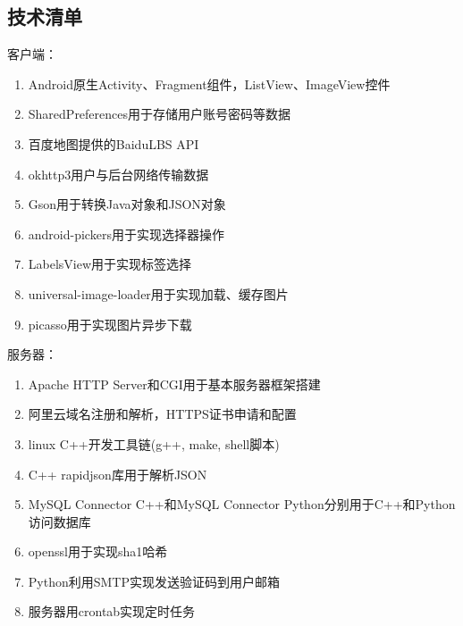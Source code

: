 \documentclass[UTF8]{article}
\begin{document}
\subsection{技术清单}
客户端：
\begin{enumerate}
    \item Android原生Activity、Fragment组件，ListView、ImageView控件
    \item SharedPreferences用于存储用户账号密码等数据
    \item 百度地图提供的BaiduLBS API
    \item okhttp3用户与后台网络传输数据
    \item Gson用于转换Java对象和JSON对象
    \item android-pickers用于实现选择器操作
    \item LabelsView用于实现标签选择
    \item universal-image-loader用于实现加载、缓存图片
    \item picasso用于实现图片异步下载
\end{enumerate}

服务器：
\begin{enumerate}
    \item Apache HTTP Server和CGI用于基本服务器框架搭建
    \item 阿里云域名注册和解析，HTTPS证书申请和配置
    \item linux C++开发工具链(g++, make, shell脚本)
    \item C++ rapidjson库用于解析JSON
    \item MySQL Connector C++和MySQL Connector Python分别用于C++和Python访问数据库
    \item openssl用于实现sha1哈希
    \item Python利用SMTP实现发送验证码到用户邮箱
    \item 服务器用crontab实现定时任务
\end{enumerate}
\end{document}
